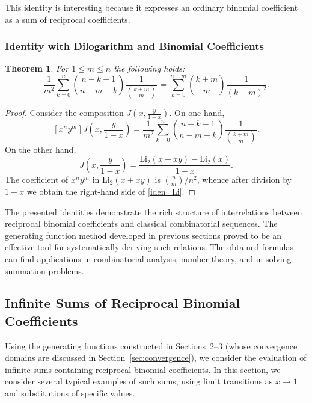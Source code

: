 \documentclass[12pt]{article}
\newtheorem{theorem}{Theorem}[section]
\begin{document}
This identity is interesting because it expresses an ordinary binomial coefficient as a sum of reciprocal coefficients.

\subsubsection{Identity with Dilogarithm and Binomial Coefficients}

\begin{theorem}
 For \( 1 \leq m \leq n \) the following holds:
\begin{equation}\label{iden_Li}
\frac{1}{m^2} \sum_{k=0}^{n} \binom{n-k-1}{n-m-k} \frac{1}{\binom{k+m}{m}}
= \sum_{k=0}^{n-m} \binom{k+m}{m} \frac{1}{(k+m)^2}.
\end{equation}
\end{theorem}
\begin{proof}
Consider the composition \( J\!\left(x, \frac{y}{1-x}\right) \). On one hand,
\[
[x^n y^m] J\!\left(x, \frac{y}{1-x}\right)
= \frac{1}{m^2} \sum_{k=0}^{n} \binom{n-k-1}{n-m-k} \frac{1}{\binom{k+m}{m}}.
\]
On the other hand,
\[
J\!\left(x, \frac{y}{1-x}\right) = \frac{\mathrm{Li}_2(x+xy) - \mathrm{Li}_2(x)}{1-x}.
\]
The coefficient of \( x^n y^m \) in \( \mathrm{Li}_2(x+xy) \) is \( \binom{n}{m}/n^2 \), whence after division by \( 1-x \) we obtain the right-hand side of \eqref{iden_Li}.
\end{proof}

The presented identities demonstrate the rich structure of interrelations between\! reciprocal binomial coefficients and classical combinatorial sequences. The generating function method developed in previous sections proved to be an effective tool for systematically deriving such relations. The obtained formulas can find applications in combinatorial analysis, number theory, and in solving summation problems.

\subsection{Infinite Sums of Reciprocal Binomial Coefficients}\label{sec:infinite-sums}

Using the generating functions constructed in Sections~2--3 (whose convergence domains are discussed in Section~\ref{sec:convergence}), we consider the evaluation of infinite sums containing reciprocal binomial coefficients. In this section, we consider several typical examples of such sums, using limit transitions as \( x \to 1 \) and substitutions of specific values.
\end{document}
